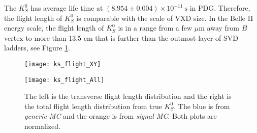  The $K_S^0$ has average life time at $(8.954 \pm 0.004) \times 10 ^{-11} \:\text{s}$ in PDG. Therefore, the flight length of $K_S^0$ is comparable with the scale of VXD size. In the Belle II energy scale, the flight length of $K_S^0$ is in a range from a few $\mu$m away from $B$ vertex to more than 13.5 cm that is further than the outmost layer of SVD ladders, see Figure \ref{fig:ks_flight}.

 \begin{figure}[htpb]
 	\centering 
 	\begin{minipage}[t]{0.45\linewidth}
 	\texttt{[image: ks\_flight\_XY]}
 	\end{minipage}
	\begin{minipage}[t]{0.45\linewidth}
		\texttt{[image: ks\_flight\_All]}
	\end{minipage}
 	\caption{The left is the transverse flight length distribution and the right is the total flight length distribution from true $K_S^0$.  The blue is from \textit{generic MC} and  the orange is from \textit{signal MC}. Both plots are normalized.}
 	\label{fig:ks_flight}
 \end{figure}
 
